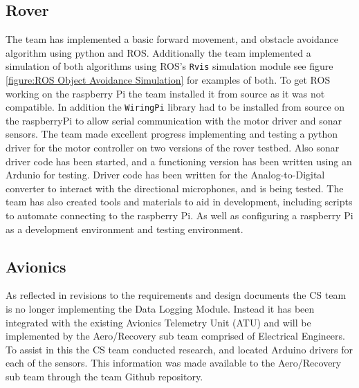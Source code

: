 \documentclass[onecolumn, draftclsnofoot,10pt, compsoc]{IEEEtran}
\begin{document}
\subsection{Rover}
The team has implemented a basic forward movement, and obstacle avoidance algorithm using python and ROS. Additionally the team implemented a simulation of both algorithms using ROS's \texttt{Rvis} simulation module see figure \ref{figure:ROS Object Avoidance Simulation} for examples of both. To get ROS working on the raspberry Pi the team installed it from source as it was not compatible. In addition the \texttt{WiringPi} library had to be installed from source on the raspberryPi to allow serial communication with the motor driver and sonar sensors. The team made excellent progress implementing and testing a python driver for the motor controller on two versions of the rover testbed. Also sonar driver code has been started, and a functioning version has been written using an Ardunio for testing. Driver code has been written for the Analog-to-Digital converter to interact with the directional microphones, and is being tested. The team has also created tools and materials to aid in development, including scripts to automate connecting to the raspberry Pi. As well as configuring a raspberry Pi as a development environment and testing environment.   

\subsection{Avionics}
As reflected in revisions to the requirements and design documents the CS team is no longer implementing the Data Logging Module. Instead it has been integrated with the existing Avionics Telemetry Unit (ATU) and will be implemented by the Aero/Recovery sub team comprised of Electrical Engineers. To assist in this the CS team conducted research, and located Arduino drivers for each of the sensors. This information was made available to the Aero/Recovery sub team through the team Github repository.  
\end{document}
